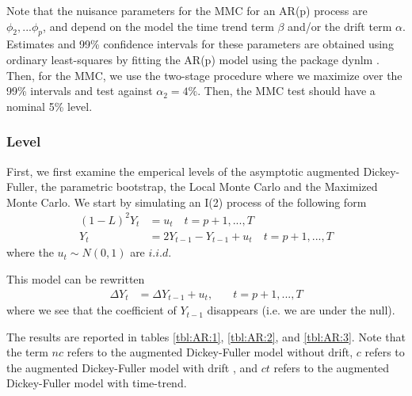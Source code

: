 \documentclass[]{article}\usepackage[]{graphicx}\usepackage[]{color}
\newcommand{\pkg}[1]{{\normalfont\fontseries{b}\selectfont #1}}
\begin{document}
Note that the nuisance parameters for the MMC for an AR(p) process are $\phi_2,...\phi_p$, and depend on the model the time trend term $\beta$ and/or the drift term $\alpha$. Estimates and 99\% confidence intervals for these parameters are obtained using ordinary least-squares by fitting the AR(p) model using the package \pkg{dynlm} \citep{zeileis_dynlm:_2014}. Then, for the MMC, we use the two-stage procedure where we maximize over the 99\% intervals and test against $\alpha_2=4\%$. Then, the MMC test should have a nominal 5\% level.

\subsubsection{Level}

First, we first examine the emperical levels of the asymptotic augmented Dickey-Fuller, the parametric bootstrap, the Local Monte Carlo and the Maximized Monte Carlo. We start by simulating an I(2) process of the following form
\begin{align}
	(1-L)^2 Y_t & = u_t \quad t = p + 1, ... , T \\
	Y_t & = 2Y_{t-1}-Y_{t-1} + u_t \quad t = p + 1, ... , T
\end{align}
where the $u_t \sim N(0,1)$ are $i.i.d.$

This model can be rewritten
\begin{align}
	\Delta Y_t & =  \Delta Y_{t-1} + u_t, & \quad t = p + 1, ... , T
\end{align}
where we see that the coefficient of $Y_{t-1}$ disappears (i.e. we are under the null).

The results are reported in tables \ref{tbl:AR:1}, \ref{tbl:AR:2}, and \ref{tbl:AR:3}. Note that the term $nc$ refers to the augmented Dickey-Fuller model without drift, $c$ refers to the augmented Dickey-Fuller model with drift , and $ct$ refers to the augmented Dickey-Fuller model with time-trend.

\begin{table}[H]
	\centering
	\caption{Empirical levels for 250 replications of I(2) process where $\alpha = 5\%$, testing $H_0: \gamma = 0$ against $H_1:  \gamma < 0$}
	\label{tbl:AR:1}
\end{table}
\end{document}

